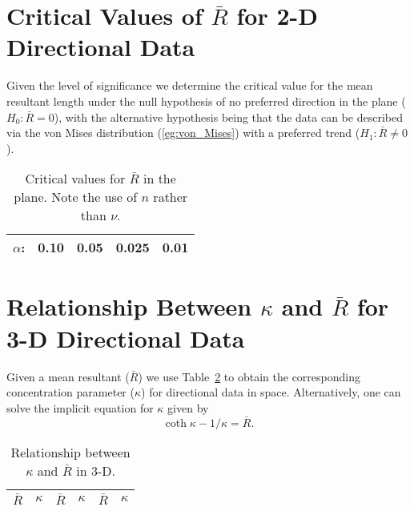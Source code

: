 \section{Critical Values of $\bar{R}$ for 2-D Directional Data}
Given the level of significance we determine the critical value for the mean resultant
length under the null hypothesis of no preferred direction in the plane ($H_0: \bar{R} = 0$), with the alternative hypothesis
being that the data can be described via the von Mises distribution (\ref{eg:von_Mises}) with a preferred trend ($H_1: \bar{R} \neq 0$).
\begin{table}[h]
\centering
\begin{tabular}{|c|cccc|} \hline
$\alpha$:  &  \bf{0.10}  & \bf{0.05} & \bf{0.025} & \bf{0.01} \\ \hline

\end{tabular}
\caption{Critical values for $\bar{R}$ in the plane.  Note the use of $n$ rather than $\nu$.}
\label{tbl:Critical_R2}
\end{table}

\clearpage
\section{Relationship Between $\kappa$ and $\bar{R}$ for 3-D Directional Data}
Given a mean resultant ($\bar{R}$) we use Table~\ref{tbl:Critical_kappa3} to obtain the corresponding concentration parameter ($\kappa$)
for directional data in space.
Alternatively, one can solve the implicit equation for $\kappa$ given by
\begin{equation}
	\coth{\kappa} - 1/\kappa = \bar{R}.
	\label{eq:kappa3d}
\end{equation}
\begin{table}[h]
\centering
\begin{tabular}{|cc|cc|cc|} \hline
$\bar{R}$  &  $\kappa$  & $\bar{R}$  &  $\kappa$ & $\bar{R}$  &  $\kappa$ \\ \hline

\end{tabular}
\caption{Relationship between $\kappa$ and $\bar{R}$ in 3-D.}
\label{tbl:Critical_kappa3}
\end{table}
\clearpage
